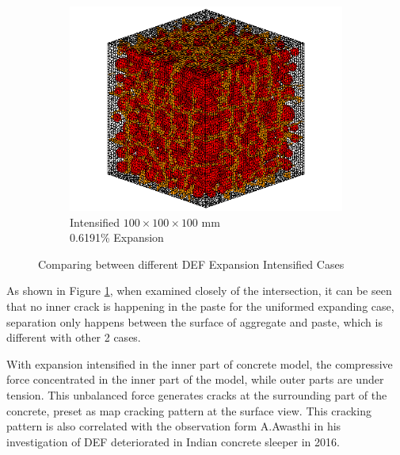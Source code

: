 \begin{figure}[ht!]
\begin{subfigure}{.3\textwidth}
      \includegraphics[width=.9\linewidth]{Files/exp_3D/DEF/A30X-1C_3_c.png}
    \caption{Intensified $100 \times 100 \times 100$ mm \\  0.6191\% Expansion}
    \end{subfigure}%

  \caption{Comparing between different DEF Expansion Intensified Cases}
  \label{fisg:DEF_X_compare}
\end{figure}


As shown in Figure \ref{fisg:DEF_X_compare}, when examined closely of the intersection, it can be seen that no inner crack is happening in the paste for the uniformed expanding case, separation only happens between the surface of aggregate and paste, which is different with other 2 cases.

With expansion intensified in the inner part of concrete model, the compressive force concentrated in the inner part of the model, while outer parts are under tension. This unbalanced force generates cracks at the surrounding part of the concrete, preset as map cracking pattern at the surface view. This cracking pattern is also correlated with the observation form A.Awasthi in his investigation of DEF deteriorated in Indian concrete sleeper in 2016\cite{Awasthi}.
